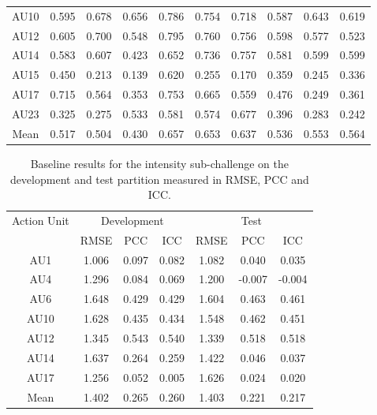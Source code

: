 \documentclass[a4paper, 10pt, conference]{ieeeconf}      \usepackage{FG2017}
\begin{document}
\begin{table*}[t]
\begin{center}
\begin{tabular}{c|c|c|c|c|c|c|c|c|c|}
AU10 & 0.595 & 0.678 & 0.656 & 0.786 & 0.754 & 0.718 & 0.587 & 0.643 & 0.619 \\ 
AU12 & 0.605 & 0.700 & 0.548 & 0.795 & 0.760 & 0.756 & 0.598 & 0.577 & 0.523 \\ 
AU14 & 0.583 & 0.607 & 0.423 & 0.652 & 0.736 & 0.757 & 0.581 & 0.599 & 0.599 \\ 
AU15 & 0.450 & 0.213 & 0.139 & 0.620 & 0.255 & 0.170 & 0.359 & 0.245 & 0.336 \\ 
AU17 & 0.715 & 0.564 & 0.353 & 0.753 & 0.665 & 0.559 & 0.476 & 0.249 & 0.361 \\ 
AU23 & 0.325 & 0.275 & 0.533 & 0.581 & 0.574 & 0.677 & 0.396 & 0.283 & 0.242 \\ 
\hline
Mean & 0.517 & 0.504 & 0.430 & 0.657 & 0.653 & 0.637 & 0.536 & 0.553 & 0.564 
 \\
\hline
\end{tabular}
\end{center}
\end{table*}







\begin{table*}[t]
\begin{center}
\caption{Baseline results for the intensity sub-challenge on the development and test partition measured in RMSE, PCC and ICC.}
\vspace{2mm}
\label{t:baseline_intensity_results}
\begin{tabular}{c|c|c|c|c|c|c}
\hline
\multirow{2}{*}{Action Unit} & \multicolumn{3}{c|}{Development} & \multicolumn{3}{c}{Test} \\
\hhline{~------}
& RMSE & PCC & ICC & RMSE & PCC & ICC \\
\hline
AU1 & 1.006 & 0.097 & 0.082 & 1.082 & 0.040 & 0.035 \\ 
AU4 & 1.296 & 0.084 & 0.069 & 1.200 & -0.007 & -0.004 \\
AU6 & 1.648 & 0.429 & 0.429 & 1.604 & 0.463 & 0.461 \\ 
AU10 & 1.628 & 0.435 & 0.434 & 1.548 & 0.462 & 0.451 \\
AU12 & 1.345 & 0.543 & 0.540 & 1.339 & 0.518 & 0.518 \\ 
AU14 & 1.637 & 0.264 & 0.259 & 1.422 & 0.046 & 0.037 \\  
AU17 & 1.256 & 0.052 & 0.005 & 1.626 & 0.024 & 0.020 \\ 
\hline
Mean & 1.402 & 0.265 & 0.260 & 1.403 & 0.221 & 0.217 \\
\hline
\end{tabular}
\end{center}
\end{table*}
\end{document}
